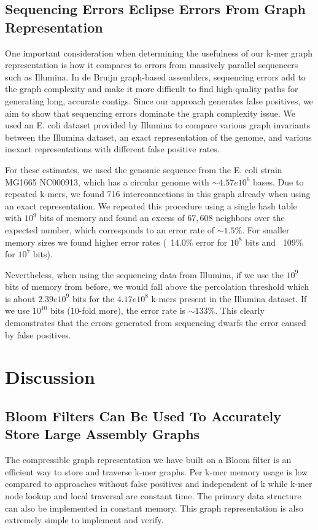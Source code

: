 \documentclass[12pt]{article} \usepackage{simplemargins}
\begin{document}
\subsection{Sequencing Errors Eclipse Errors From Graph Representation}
One important consideration when determining the usefulness of our k-mer
graph representation is how it compares to errors from massively
parallel sequencers such as Illumina. In de Bruijn graph-based
assemblers, sequencing errors add to the graph complexity and make it
more difficult to find high-quality paths for generating long,
accurate contigs. Since our approach generates
false positives, we aim to show that sequencing errors dominate the graph complexity
issue. We used an E. coli dataset provided by Illumina to compare
various graph invariants between the Illumina dataset, an exact
representation of the genome, and various inexact representations with
different false positive rates.

For these estimates, we used the genomic sequence from the E. coli strain 
MG1665 NC000913, which has a circular genome with $\sim 4.57e10^6$ bases. 
Due to 
repeated k-mers, we found 716 interconnections in this graph 
already when using an exact representation. We repeated this procedure 
using a single hash table with $10^9$ bits of memory and found an excess of 
$67,608$ neighbors over the expected number, which corresponds to an error rate of 
$\sim 1.5\%$. For smaller memory 
sizes we found higher error rates (~14.0\% error for $10^8$ bits and 
~109\% for $10^7$ bits).

Nevertheless, when using 
the sequencing data from Illumina, if we use the $10^9$ bits of memory 
from before, we would fall above the percolation threshold which is 
about $2.39e10^9$ bits for the 
$4.17e10^8$ k-mers present in the Illumina dataset. 
If we use $10^{10}$ bits (10-fold more), the error rate is 
$\sim 133\%$. This clearly demonstrates that
the errors generated from sequencing dwarfs the error caused by false positives.

\section{Discussion}

\subsection{Bloom Filters Can Be Used To Accurately Store Large Assembly Graphs}
The compressible graph representation we have built on a Bloom filter
is an efficient way to store and traverse k-mer graphs.  Per k-mer
memory usage is low compared to approaches without false positives
and independent of k while k-mer node lookup and
local traversal are constant time.  The primary data structure can
also be implemented in constant memory.  This graph representation is
also extremely simple to implement and verify.
\end{document}
